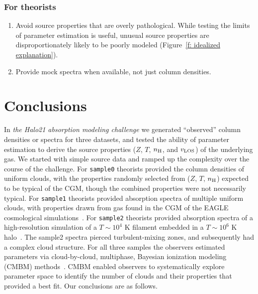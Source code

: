 \documentclass[fleqn,usenatbib]{mnras}
\begin{document}
\subsubsection{For theorists}

\begin{enumerate}
    \item Avoid source properties that are overly pathological. While testing the limits of  parameter estimation is useful, unusual source properties are disproportionately likely to be poorly modeled (Figure~\ref{f: idealized explanation}).
    \item Provide mock spectra when available, not just column densities.
\end{enumerate}

\section{Conclusions}
\label{s: conclusions}

In \textit{the Halo21 absorption modeling challenge} we generated ``observed'' column densities or spectra for three datasets,
and tested the ability of parameter estimation to derive the source properties ($Z$, $T$, $n_{\rm H}$, and $v_{\rm LOS}$) of the underlying gas.
We started with simple source data and ramped up the complexity over the course of the challenge.
For \texttt{sample0} theorists provided the column densities of uniform clouds, with the properties randomly selected from ($Z$, $T$, $n_{\rm H}$) expected to be typical of the CGM, though the combined properties were not necessarily typical.
For \texttt{sample1} theorists provided absorption spectra of multiple uniform clouds, with properties drawn from gas found in the CGM of the EAGLE cosmological simulations~\citep[e.g.][]{schaye2015EAGLE}.
For \texttt{sample2} theorists provided absorption spectra of a high-resolution simulation of a $T \sim 10^4$ K filament embedded in a $T \sim 10^6$ K halo~\citep{mandelker2020Instability}.
The sample2 spectra pierced turbulent-mixing zones, and subsequently had a complex cloud structure.
For all three samples the observers estimated parameters via cloud-by-cloud, multiphase, Bayesian ionization modeling (CMBM) methods~\citep{sameer2021Cloudbycloud, sameer2022Probing}.
CMBM enabled observers to systematically explore parameter space to identify the number of clouds and their properties that provided a best fit.
Our conclusions are as follows.
\end{document}

